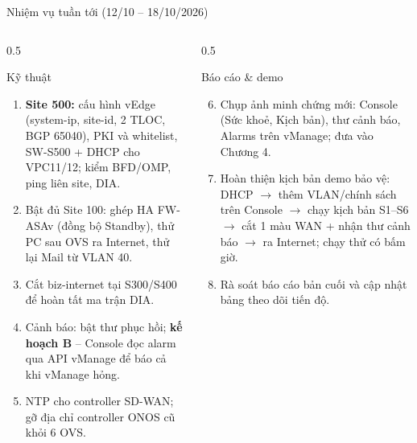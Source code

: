 \documentclass[aspectratio=169, 10pt]{beamer}
\begin{document}
\begin{frame}{Nhiệm vụ tuần tới (12/10 -- 18/10/2026)}
    \begin{columns}[T]
        \begin{column}{0.5\textwidth}
            \begin{block}{Kỹ thuật}
                \small
                \begin{enumerate}
                    \item \textbf{Site 500:} cấu hình vEdge (system-ip, site-id, 2 TLOC, BGP 65040), PKI và whitelist,
                          SW-S500 + DHCP cho VPC11/12; kiểm BFD/OMP, ping liên site, DIA.
                    \item Bật đủ Site 100: ghép HA FW-ASAv (đồng bộ Standby), thử PC sau OVS ra Internet,
                          thử lại Mail từ VLAN 40.
                    \item Cắt biz-internet tại S300/S400 để hoàn tất ma trận DIA.
                    \item Cảnh báo: bật thư phục hồi; \textbf{kế hoạch B} -- Console đọc alarm qua API vManage
                          để báo cả khi vManage hỏng.
                    \item NTP cho controller SD-WAN; gỡ địa chỉ controller ONOS cũ khỏi 6 OVS.
                \end{enumerate}
            \end{block}
        \end{column}
        \begin{column}{0.5\textwidth}
            \begin{block}{Báo cáo \& demo}
                \small
                \begin{enumerate}
                    \setcounter{enumi}{5}
                    \item Chụp ảnh minh chứng mới: Console (Sức khoẻ, Kịch bản), thư cảnh báo, Alarms trên vManage;
                          đưa vào Chương 4.
                    \item Hoàn thiện kịch bản demo bảo vệ: DHCP $\rightarrow$ thêm VLAN/chính sách trên Console
                          $\rightarrow$ chạy kịch bản S1--S6 $\rightarrow$ cắt 1 màu WAN + nhận thư cảnh báo
                          $\rightarrow$ ra Internet; chạy thử có bấm giờ.
                    \item Rà soát báo cáo bản cuối và cập nhật bảng theo dõi tiến độ.
                \end{enumerate}
            \end{block}
        \end{column}
    \end{columns}
\end{frame}
\end{document}
